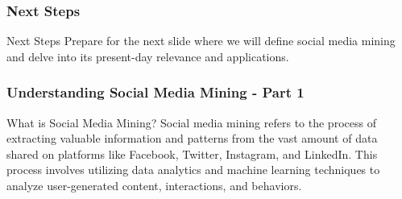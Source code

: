 \documentclass{beamer}
\begin{document}
\begin{frame}[fragile]
    \frametitle{Next Steps}
    \begin{block}{Next Steps}
        Prepare for the next slide where we will define social media mining and delve into its present-day relevance and applications.
    \end{block}
\end{frame}

\begin{frame}[fragile]
    \frametitle{Understanding Social Media Mining - Part 1}
    \begin{block}{What is Social Media Mining?}
        Social media mining refers to the process of extracting valuable information and patterns from the vast amount of data shared on platforms like Facebook, Twitter, Instagram, and LinkedIn. This process involves utilizing data analytics and machine learning techniques to analyze user-generated content, interactions, and behaviors.
    \end{block}
\end{frame}
\end{document}
